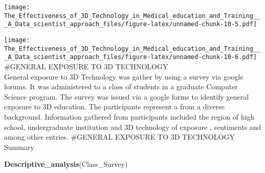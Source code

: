 \documentclass[]{article}
\newenvironment{Shaded}{\begin{snugshade}}{\end{snugshade}}
\newcommand{\DataTypeTok}[1]{\textcolor[rgb]{0.13,0.29,0.53}{#1}}
\newcommand{\KeywordTok}[1]{\textcolor[rgb]{0.13,0.29,0.53}{\textbf{#1}}}
\newcommand{\NormalTok}[1]{#1}
\newcommand{\OperatorTok}[1]{\textcolor[rgb]{0.81,0.36,0.00}{\textbf{#1}}}
\newcommand{\StringTok}[1]{\textcolor[rgb]{0.31,0.60,0.02}{#1}}
\begin{document}
\texttt{[image: The\_Effectiveness\_of\_3D\_Technology\_in\_Medical\_education\_and\_Training\_\_\_A\_Data\_scientist\_approach\_files/figure-latex/unnamed-chunk-10-5.pdf]}

\begin{Shaded}
\end{Shaded}

\texttt{[image: The\_Effectiveness\_of\_3D\_Technology\_in\_Medical\_education\_and\_Training\_\_\_A\_Data\_scientist\_approach\_files/figure-latex/unnamed-chunk-10-6.pdf]}
\#GENERAL EXPOSURE TO 3D TECHNOLOGY\\
General exposure to 3D Technology was gather by using a survey via
google forums. It was administered to a class of students in a graduate
Computer Science program. The survey was issued via a google forms to
identify general exposure to 3D education. The participants represent a
from a diverse background. Information gathered from participants
included the region of high school, undergraduate institution and 3D
technology of exposure , sentiments and among other entries. \#GENERAL
EXPOSURE TO 3D TECHNOLOGY Summary

\begin{Shaded}
\begin{Highlighting}[]
\KeywordTok{Descriptive_analysis}\NormalTok{(Class_Survey)}
\end{Highlighting}
\end{Shaded}
\end{document}
